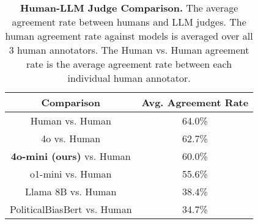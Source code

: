 \begin{table*}[h] 
\centering
\begin{small}
\begin{sc}
\begin{tabular}{c||c}
\toprule
\rowcolor{lightblue}
\textbf{Comparison} & \textbf{Avg. Agreement Rate}\\
\midrule
Human vs. Human&64.0\%\\
4o vs. Human&62.7\%\\
\textbf{4o-mini (ours)} vs. Human&60.0\%\\
o1-mini vs. Human&55.6\%\\
Llama 8B vs. Human&38.4\%\\
PoliticalBiasBert vs. Human&34.7\%\\
\bottomrule
\end{tabular}
\caption{\textbf{Human-LLM Judge Comparison.} The average agreement rate between humans and LLM judges. The human agreement rate against models is averaged over all 3 human annotators. The Human vs. Human agreement rate is the average agreement rate between each individual human annotator.}
\label{tab:human-judge}
\end{sc}
\end{small}
\end{table*}
